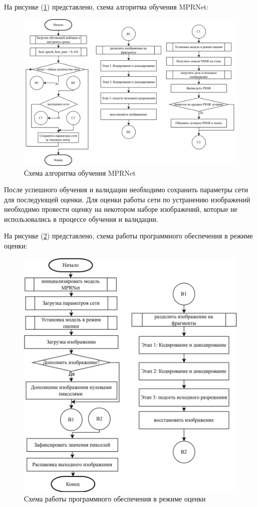 На рисунке (\ref{fig:training-model}) представлено, схема алгоритма обучения MPRNet: 
\begin{figure}[H]
	\includegraphics[width=1.0\linewidth]{assets/train-diagram.png}
	\caption{Схема алгоритма обучения MPRNet}
	\label{fig:training-model}
\end{figure}

После успешного обучения и валидации необходимо сохранить параметры сети для последующей оценки. Для оценки работы сети по устранению изображений необходимо провести оценку на некотором наборе изображений, которые не использовались в процессе обучения и валидации.

На рисунке (\ref{fig:predict-model}) представлено, схема работы программного обеспечения в режиме оценки: 
\begin{figure}[H]
	\centering
	\includegraphics[width=1.0\linewidth]{assets/predict-diagram.png}
	\caption{Схема работы программного обеспечения в режиме оценки}
	\label{fig:predict-model}
\end{figure}

